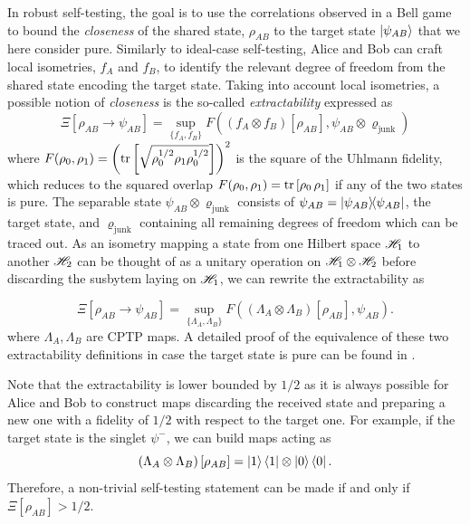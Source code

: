 In robust self-testing, the goal is to use the correlations observed in a Bell game to bound the \textit{closeness} of the shared state, $\rho_{AB}$ to the target state $\ket{\psi_{AB}}$ that we here consider pure.
Similarly to ideal-case self-testing, Alice and Bob can craft local isometries, $f_A$ and $f_B$, to identify the relevant degree of freedom from the shared state encoding the target state.
Taking into account local isometries, a possible notion of \textit{closeness} is the so-called \textit{extractability} expressed as
\begin{equation}
	\Xi [\rho_{AB} \rightarrow \psi_{AB}] = \sup_{\{f_A,f_B\}} F((f_A \otimes f_B)[\rho_{AB}],\psi_{AB} \otimes \varrho_\text{junk})
	\label{eq:extractability_junk}
\end{equation}
where $F(\rho_0,\rho_1) = \left(\trr{\sqrt{\rho_0^{1/2}\rho_1\rho_0^{1/2}}}\right)^2$ is the square of the Uhlmann fidelity, which reduces to the squared overlap $F(\rho_0,\rho_1)=\trr{\rho_0\,\rho_1}$ if any of the two states is pure.
The separable state $\psi_{AB} \otimes \varrho_\text{junk}$ consists of $\psi_{AB} = \ketbra{\psi_{AB}}$, the target state, and $\varrho_\text{junk}$ containing all remaining degrees of freedom which can be traced out.
As an isometry mapping a state from one Hilbert space $\mathscr{H}_1$ to another $\mathscr{H}_2$ can be thought of as a unitary operation on $\mathscr{H}_1 \otimes \mathscr{H}_2$ before discarding the susbytem laying on $\mathscr{H}_1$, we can rewrite the extractability as
 
\begin{equation}
	\Xi [\rho_{AB} \rightarrow \psi_{AB}] = \sup_{\{\Lambda_A,\Lambda_B\}} F((\Lambda_A \otimes \Lambda_B)[\rho_{AB}],\psi_{AB}).
	\label{eq:extractability}
\end{equation}
where $\Lambda_A,\Lambda_B$ are \acrfull{CPTP} maps. 
A detailed proof of the equivalence of these two extractability definitions in case the target state is pure can be found in \cite{Sekatski2018}.


Note that the extractability is lower bounded by $1/2$ as it is always possible for Alice and Bob to construct maps discarding the received state and preparing a new one with a fidelity of $1/2$ with respect to the target one. 
For example, if the target state is the singlet $\psi^{-}$, we can build maps acting as
\begin{equation}	
	\left(\Lambda_A \otimes \Lambda_B\right)[\rho_{AB}] = \ket{1}\bra{1} \otimes \ket{0}\bra{0}.
\end{equation}
Therefore, a non-trivial self-testing statement can be made if and only if $\Xi[\rho_{AB}]>1/2$.


